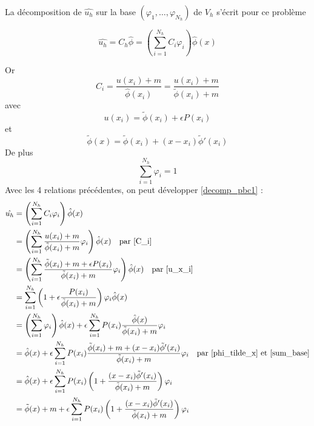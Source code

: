 La décomposition de $\hat{u_h}$ sur la base $(\varphi_1,\dots,\varphi_{N_h})$ de $V_h$ s'écrit pour ce problème

\begin{equation}
	\hat{u_h}=C_h\hat{\phi}=\left(\sum_{i=1}^{N_h}C_i\varphi_i\right)\hat{\phi}(x) \label{decomp_pbc1}
\end{equation}

Or 
\begin{equation}
	C_i=\frac{u(x_i)+m}{\hat{\phi}(x_i)}=\frac{u(x_i)+m}{\tilde{\phi}(x_i)+m} \label{C_i}
\end{equation}
avec
\begin{equation}
	u(x_i)=\tilde{\phi}(x_i)+\epsilon P(x_i) \label{u_x_i}
\end{equation}
et
\begin{equation}
	\tilde{\phi}(x)=\tilde{\phi}(x_i)+(x-x_i)\tilde{\phi}'(x_i) \label{phi_tilde_x}
\end{equation}
De plus
\begin{equation}
	\sum_{i=1}^{N_h}\varphi_i=1 \label{sum_base}
\end{equation}
Avec les 4 relations précédentes, on peut développer \ref{decomp_pbc1} :
\begin{align*}
	\hat{u_h}&=\left(\sum_{i=1}^{N_h}C_i\varphi_i\right)\hat{\phi}(x) \\
	&=\left(\sum_{i=1}^{N_h}\frac{u(x_i)+m}{\tilde{\phi}(x_i)+m}\varphi_i\right)\hat{\phi}(x) \quad \text{par \ref{C_i}} \\
	&=\left(\sum_{i=1}^{N_h}\frac{\tilde{\phi}(x_i)+m+\epsilon P(x_i)}{\tilde{\phi}(x_i)+m}\varphi_i\right)\hat{\phi}(x) \quad \text{par \ref{u_x_i}} \\
	&=\sum_{i=1}^{N_h}\left(1+\epsilon\frac{ P(x_i)}{\tilde{\phi}(x_i)+m}\right)\varphi_i\hat{\phi}(x) \\
	&=\left(\sum_{i=1}^{N_h}\varphi_i\right)\hat{\phi}(x)+\epsilon\sum_{i=1}^{N_h}P(x_i)\frac{\hat{\phi}(x)}{\tilde{\phi}(x_i)+m}\varphi_i \\
	&=\hat{\phi}(x)+\epsilon\sum_{i=1}^{N_h}P(x_i)\frac{\tilde{\phi}(x_i)+m+(x-x_i)\tilde{\phi}'(x_i)}{\tilde{\phi}(x_i)+m}\varphi_i \quad \text{par \ref{phi_tilde_x} et \ref{sum_base}} \\
	&=\hat{\phi}(x)+\epsilon\sum_{i=1}^{N_h}P(x_i)\left(1+\frac{(x-x_i)\tilde{\phi}'(x_i)}{\tilde{\phi}(x_i)+m}\right)\varphi_i \\
	&=\tilde{\phi}(x)+m+\epsilon\sum_{i=1}^{N_h}P(x_i)\left(1+\frac{(x-x_i)\tilde{\phi}'(x_i)}{\tilde{\phi}(x_i)+m}\right)\varphi_i \\
\end{align*}

